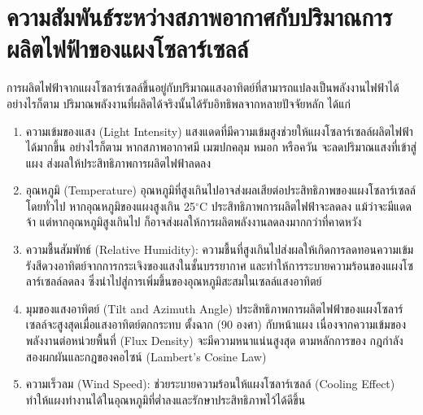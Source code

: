 \section{ความสัมพันธ์ระหว่างสภาพอากาศกับปริมาณการผลิตไฟฟ้าของแผงโซลาร์เซลล์ }
\hspace{\parindent}การผลิตไฟฟ้าจากแผงโซลาร์เซลล์ขึ้นอยู่กับปริมาณแสงอาทิตย์ที่สามารถแปลงเป็นพลังงานไฟฟ้าได้ 
อย่างไรก็ตาม ปริมาณพลังงานที่ผลิตได้จริงนั้นได้รับอิทธิพลจากหลายปัจจัยหลัก ได้แก่ 
\begin{enumerate}
  \item ความเข้มของแสง (Light Intensity) แสงแดดที่มีความเข้มสูงช่วยให้แผงโซลาร์เซลล์ผลิตไฟฟ้าได้มากขึ้น 
อย่างไรก็ตาม หากสภาพอากาศมี เมฆปกคลุม หมอก หรือควัน จะลดปริมาณแสงที่เข้าสู่แผง 
ส่งผลให้ประสิทธิภาพการผลิตไฟฟ้าลดลง
  \item อุณหภูมิ (Temperature) อุณหภูมิที่สูงเกินไปอาจส่งผลเสียต่อประสิทธิภาพของแผงโซลาร์เซลล์ โดยทั่วไป 
หากอุณหภูมิของแผงสูงเกิน 25$^\circ$C ประสิทธิภาพการผลิตไฟฟ้าจะลดลง แม้ว่าจะมีแดดจ้า 
แต่หากอุณหภูมิสูงเกินไป ก็อาจส่งผลให้การผลิตพลังงานลดลงมากกว่าที่คาดหวัง
  \item ความชื้นสัมพัทธ์ (Relative Humidity): ความชื้นที่สูงเกินไปส่งผลให้เกิดการลดทอนความเข้มรังสีดวงอาทิตย์จากการกระเจิงของแสงในชั้นบรรยากาศ และทำให้การระบายความร้อนของแผงโซลาร์เซลล์ลดลง
  ซึ่งนำไปสู่การเพิ่มขึ้นของอุณหภูมิสะสมในเซลล์แสงอาทิตย์
  \item มุมของแสงอาทิตย์ (Tilt and Azimuth Angle) ประสิทธิภาพการผลิตไฟฟ้าของแผงโซลาร์เซลล์จะสูงสุดเมื่อแสงอาทิตย์ตกกระทบ ตั้งฉาก (90 องศา) กับหน้าแผง เนื่องจากความเข้มของพลังงานต่อหน่วยพื้นที่ (Flux Density) จะมีความหนาแน่นสูงสุด ตามหลักการของ 
  กฎกำลังสองผกผันและกฎของคอไซน์ (Lambert's Cosine Law)
  \item ความเร็วลม (Wind Speed): ช่วยระบายความร้อนให้แผงโซลาร์เซลล์ (Cooling Effect) ทำให้แผงทำงานได้ในอุณหภูมิที่ต่ำลงและรักษาประสิทธิภาพไว้ได้ดีขึ้น \cite{pandey2016}\cite{mekhilef2011}
\end{enumerate}


